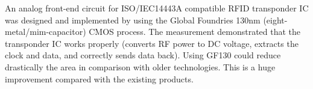 An analog front-end circuit for ISO/IEC14443A compatible RFID transponder IC was designed and implemented by using the Global Foundries 130nm (eight-metal/mim-capacitor) CMOS process. The measurement demonstrated that the transponder IC works properly (converts RF power to DC voltage, extracts the clock and data, and correctly sends data back). Using GF130 could reduce drastically the area in comparison with older technologies. This is a huge improvement compared with the existing products.

